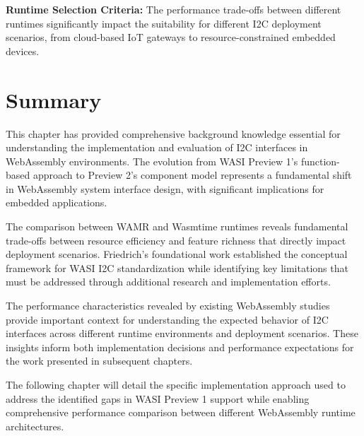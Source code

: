\textbf{Runtime Selection Criteria:} The performance trade-offs between different runtimes significantly impact the suitability for different I2C deployment scenarios, from cloud-based IoT gateways to resource-constrained embedded devices.

\section{Summary}
\label{sec:background-summary}

This chapter has provided comprehensive background knowledge essential for understanding the implementation and evaluation of I2C interfaces in WebAssembly environments. The evolution from WASI Preview 1's function-based approach to Preview 2's component model represents a fundamental shift in WebAssembly system interface design, with significant implications for embedded applications.

The comparison between WAMR and Wasmtime runtimes reveals fundamental trade-offs between resource efficiency and feature richness that directly impact deployment scenarios. Friedrich's foundational work established the conceptual framework for WASI I2C standardization while identifying key limitations that must be addressed through additional research and implementation efforts.

The performance characteristics revealed by existing WebAssembly studies provide important context for understanding the expected behavior of I2C interfaces across different runtime environments and deployment scenarios. These insights inform both implementation decisions and performance expectations for the work presented in subsequent chapters.

The following chapter will detail the specific implementation approach used to address the identified gaps in WASI Preview 1 support while enabling comprehensive performance comparison between different WebAssembly runtime architectures.